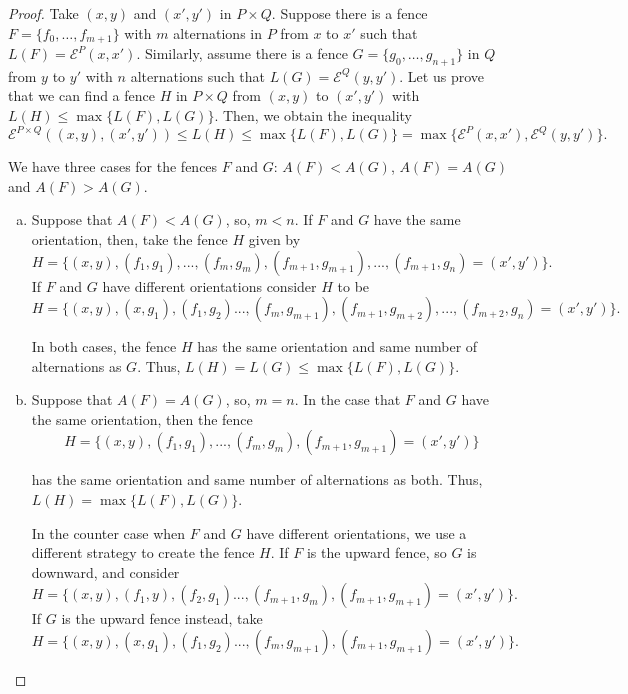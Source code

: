 \documentclass{article}[12pt]
\theoremstyle{exampstyle}
\theoremstyle{remark}
\newcommand{\E}{\mathcal{E}}
\newcommand{\tuple}[3][1]{#2_{#1}, \dots , #2_{#3}}
\begin{document}
\begin{proof}
    Take $(x,y)$ and $(x',y')$ in $P \times Q$. Suppose there is a fence $F=\{\tuple[0]{f}{m+1}\}$ with $m$ alternations in $P$  from $x$ to $x'$ such that  $L(F) = \E^{P}(x, x')$. Similarly, assume there is a fence $G=\{\tuple[0]{g}{n+1}\}$ in $Q$  from $y$ to $y'$ with $n$ alternations such that  $L(G) = \E^{Q}(y, y')$. Let us prove that we can find a fence $H$ in $P \times Q$ from $(x,y)$ to $(x',y')$ with $L(H) \leq \max\{L(F),L(G)\}$. Then, we obtain the inequality
    \begin{equation*}
        \E^{P \times Q}((x,y), (x',y')) \leq L(H) \leq \max\{L(F),L(G)\} = \max\{ \E^P(x,x') , \E^Q(y,y')\}.
    \end{equation*}
    
    We have three cases for the fences $F$ and $G$: $A(F) < A(G)$, $A(F) = A(G)$ and $A(F) > A(G)$.
    \begin{enumerate}[a)]
        \item Suppose that $A(F) < A(G)$, so, $m < n$. If $F$ and $G$ have the same orientation, then, take the fence $H$ given by 
        \begin{equation*}
            H = \{ (x,y) , (f_1,g_1) ,  ... , (f_{m}, g_m) , (f_{m+1}, g_{m+1}), ...,  (f_{m+1}, g_{n}) = (x',y')\}.
        \end{equation*}
        If $F$ and $G$ have different orientations consider $H$ to be 
        \begin{equation*}
            H = \{ (x,y) , (x,g_1) , (f_1,g_2)  ... , (f_{m}, g_{m+1}) , (f_{m+1}, g_{m+2}), ...,  (f_{m+2}, g_{n}) = (x',y')\}.
        \end{equation*}

        In both cases, the fence $H$ has the same orientation and same number of alternations as $G$. Thus, \mbox{$L(H) = L(G) \leq \max\{L(F),L(G)\}$.}

        \item Suppose that  $A(F) = A(G)$, so, $m = n$.  In the case that $F$ and $G$ have the same orientation, then the fence 
        \[H = \{ (x,y) , (f_1,g_1) ,  ... , (f_{m}, g_m) , (f_{m+1}, g_{m+1}) = (x',y')\} \]
        
        has the same orientation and same number of alternations as both. Thus, \mbox{$L(H) = \max\{L(F),L(G)\}$.}
        
        In the counter case when $F$ and $G$ have different orientations, we use a different strategy to create the fence $H$. If $F$ is the upward fence, so $G$ is downward, and consider
        \begin{equation*}
            H = \{ (x,y) , (f_1,y) , (f_2,g_1)  ... , (f_{m+1}, g_{m}) , (f_{m+1}, g_{m+1}) = (x',y')\}.
        \end{equation*}
        If $G$ is the upward fence instead, take 
        \begin{equation*}
            H = \{ (x,y) , (x,g_1) , (f_1,g_2)  ... , (f_{m}, g_{m+1}) , (f_{m+1}, g_{m+1}) = (x',y')\}.
        \end{equation*}


\end{enumerate}
\end{proof}
\end{document}
